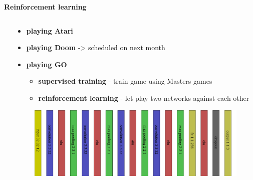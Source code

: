 \documentclass[xcolor=dvipsnames]{beamer}
\begin{document}
\begin{frame}{\bf Reinforcement learning}
\begin{columns}
\begin{column}{0.5\textwidth}
\end{column}
\begin{column}{0.5\textwidth}  %

      \begin{itemize}
      \item {\bf playing Atari}
      \item {\bf playing Doom} -> scheduled on next month
      \item {\bf playing GO}
                              {
                                  \scriptsize
                                  {
                                    \begin{itemize}
                                      \item {\bf supervised training} - train game using Masters games
                                      \item {\bf reinforcement learning} - let play two networks against each other
                                    \end{itemize}
                                  }
                               }
    \end{itemize}


    \begin{figure}[!htb]
      \centering
      \includegraphics[scale=0.12]{../../diagrams/rl/net_1.png}
    \end{figure}

\end{column}
\end{columns}

\end{frame}
\end{document}
